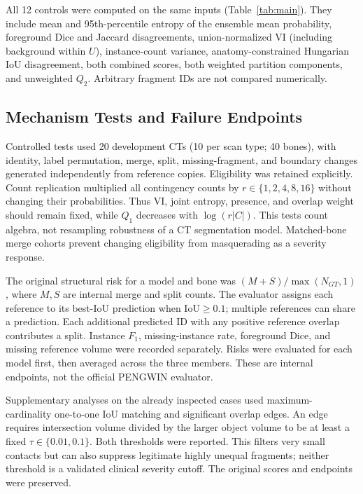 \documentclass[conference]{IEEEtran}
\begin{document}
All 12 controls were computed on the same inputs (Table~\ref{tab:main}). They include mean and 95th-percentile entropy of the ensemble mean probability, foreground Dice and Jaccard disagreements, union-normalized VI (including background within $U$), instance-count variance, anatomy-constrained Hungarian IoU disagreement, both combined scores, both weighted partition components, and unweighted $Q_2$. Arbitrary fragment IDs are not compared numerically.

\subsection{Mechanism Tests and Failure Endpoints}
Controlled tests used 20 development CTs (10 per scan type; 40 bones), with identity, label permutation, merge, split, missing-fragment, and boundary changes generated independently from reference copies. Eligibility was retained explicitly. Count replication multiplied all contingency counts by $r\in\{1,2,4,8,16\}$ without changing their probabilities. Thus VI, joint entropy, presence, and overlap weight should remain fixed, while $Q_1$ decreases with $\log(r|C|)$. This tests count algebra, not resampling robustness of a CT segmentation model. Matched-bone merge cohorts prevent changing eligibility from masquerading as a severity response.

The original structural risk for a model and bone was $(M+S)/\max(N_{GT},1)$, where $M,S$ are internal merge and split counts. The evaluator assigns each reference to its best-IoU prediction when IoU$\geq0.1$; multiple references can share a prediction. Each additional predicted ID with any positive reference overlap contributes a split. Instance $F_1$, missing-instance rate, foreground Dice, and missing reference volume were recorded separately. Risks were evaluated for each model first, then averaged across the three members. These are internal endpoints, not the official PENGWIN evaluator.

Supplementary analyses on the already inspected cases used maximum-cardinality one-to-one IoU matching and significant overlap edges. An edge requires intersection volume divided by the larger object volume to be at least a fixed $\tau\in\{0.01,0.1\}$. Both thresholds were reported. This filters very small contacts but can also suppress legitimate highly unequal fragments; neither threshold is a validated clinical severity cutoff. The original scores and endpoints were preserved.
\end{document}
